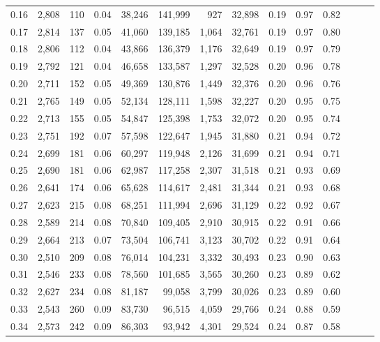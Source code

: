 \begin{tabular}{rrrrrrrrrrrrrr}
0.16 &  2,808 &  110 &  0.04 &   38,246 &  141,999 &     927 &  32,898 &  0.19 &  0.97 &      0.82 \\
0.17 &  2,814 &  137 &  0.05 &   41,060 &  139,185 &   1,064 &  32,761 &  0.19 &  0.97 &      0.80 \\
0.18 &  2,806 &  112 &  0.04 &   43,866 &  136,379 &   1,176 &  32,649 &  0.19 &  0.97 &      0.79 \\
0.19 &  2,792 &  121 &  0.04 &   46,658 &  133,587 &   1,297 &  32,528 &  0.20 &  0.96 &      0.78 \\
0.20 &  2,711 &  152 &  0.05 &   49,369 &  130,876 &   1,449 &  32,376 &  0.20 &  0.96 &      0.76 \\
0.21 &  2,765 &  149 &  0.05 &   52,134 &  128,111 &   1,598 &  32,227 &  0.20 &  0.95 &      0.75 \\
0.22 &  2,713 &  155 &  0.05 &   54,847 &  125,398 &   1,753 &  32,072 &  0.20 &  0.95 &      0.74 \\
0.23 &  2,751 &  192 &  0.07 &   57,598 &  122,647 &   1,945 &  31,880 &  0.21 &  0.94 &      0.72 \\
0.24 &  2,699 &  181 &  0.06 &   60,297 &  119,948 &   2,126 &  31,699 &  0.21 &  0.94 &      0.71 \\
0.25 &  2,690 &  181 &  0.06 &   62,987 &  117,258 &   2,307 &  31,518 &  0.21 &  0.93 &      0.69 \\
0.26 &  2,641 &  174 &  0.06 &   65,628 &  114,617 &   2,481 &  31,344 &  0.21 &  0.93 &      0.68 \\
0.27 &  2,623 &  215 &  0.08 &   68,251 &  111,994 &   2,696 &  31,129 &  0.22 &  0.92 &      0.67 \\
0.28 &  2,589 &  214 &  0.08 &   70,840 &  109,405 &   2,910 &  30,915 &  0.22 &  0.91 &      0.66 \\
0.29 &  2,664 &  213 &  0.07 &   73,504 &  106,741 &   3,123 &  30,702 &  0.22 &  0.91 &      0.64 \\
0.30 &  2,510 &  209 &  0.08 &   76,014 &  104,231 &   3,332 &  30,493 &  0.23 &  0.90 &      0.63 \\
0.31 &  2,546 &  233 &  0.08 &   78,560 &  101,685 &   3,565 &  30,260 &  0.23 &  0.89 &      0.62 \\
0.32 &  2,627 &  234 &  0.08 &   81,187 &   99,058 &   3,799 &  30,026 &  0.23 &  0.89 &      0.60 \\
0.33 &  2,543 &  260 &  0.09 &   83,730 &   96,515 &   4,059 &  29,766 &  0.24 &  0.88 &      0.59 \\
0.34 &  2,573 &  242 &  0.09 &   86,303 &   93,942 &   4,301 &  29,524 &  0.24 &  0.87 &      0.58 \\

\end{tabular}
